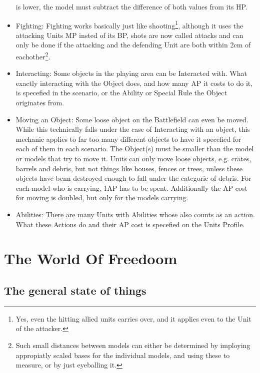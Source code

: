 \documentclass[a4paper,12pt]{book}
\begin{document}
\begin{adjustwidth}{-2cm}{-2cm}
\begin{multicols}{2}
\begin{itemize}
is lower, the model must subtract the difference of both values from its HP. 
	\item Fighting: Fighting works basically just like shooting\footnote{Yes, even the hitting allied units carries over, and it applies even to the Unit of the attacker.}, although it uses the attacking Units MP insted of its BP, shots are now called attacks and can only be done if the attacking and the defending Unit are both within 2cm of eachother\footnote{Such small distances between models can either be determined by imploying appropiatly scaled bases for the individual models, and using these to measure, or by just eyeballing it.}. 
	\item Interacting: Some objects in the playing area can be Interacted with. What exactly interacting with the Object does, and how many AP it costs to do it, is specefied in the scenario, or the Ability or Special Rule the Object originates from.
	\item Moving an Object: Some loose object on the Battlefield can even be moved. While this technically falls under the case of Interacting with an object, this mechanic applies to far too many different objects to have it specefied for each of them in each scenario. The Object(s) must be smaller than the model or models that try to move it.  Units can only move loose objects, e.g. crates, barrels and debris, but not things like houses, fences or trees, unless these objects have benn destroyed enough to fall under the categorie of debris.  For each model who is carrying, 1AP has to be spent. Additionally the AP cost for moving is doubled, but only for the models carrying.
	\item Abilities: There are many Units with Abilities whose also counts as an action. What these Actions do and their AP cost is specefied on the Units Profile.

	
\end{itemize}
\end{multicols}
\end{adjustwidth}


\pagebreak

\chapter{The World Of Freedoom}

\section{The general state of things}
\end{document}
